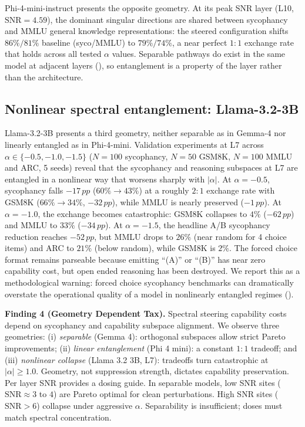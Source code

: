 \documentclass{article}
\newcommand{\snr}{\mathrm{SNR}}
\newcommand{\pp}{\,pp}
\begin{document}
Phi-4-mini-instruct presents the opposite geometry. At its peak SNR
layer (L10, $\snr{=}4.59$), the dominant singular directions are
shared between sycophancy and MMLU general knowledge representations:
the steered configuration shifts $86\%/81\%$ baseline (syco/MMLU) to
$79\%/74\%$, a near perfect $1:1$ exchange rate that holds across
all tested $\alpha$ values. Separable pathways do exist in the same
model at adjacent layers (), so entanglement is a
property of the layer rather than the architecture.

\subsection{Nonlinear spectral entanglement: Llama-3.2-3B}
\label{sec:llama3b_entanglement}

Llama-3.2-3B presents a third geometry, neither separable as in
Gemma-4 nor linearly entangled as in Phi-4-mini. Validation
experiments at L7 across $\alpha \in \{-0.5, -1.0, -1.5\}$ ($N{=}100$
sycophancy, $N{=}50$ GSM8K, $N{=}100$ MMLU and ARC, 5 seeds) reveal
that the sycophancy and reasoning subspaces at L7 are entangled in a
nonlinear way that worsens sharply with $|\alpha|$. At
$\alpha{=}{-}0.5$, sycophancy falls $-17\pp$ ($60\%\!\to\!43\%$) at a
roughly $2:1$ exchange rate with GSM8K ($66\%\!\to\!34\%$, $-32\pp$),
while MMLU is nearly preserved ($-1\pp$). At $\alpha{=}{-}1.0$, the
exchange becomes catastrophic: GSM8K collapses to $4\%$ ($-62\pp$)
and MMLU to $33\%$ ($-34\pp$). At $\alpha{=}{-}1.5$, the headline A/B
sycophancy reduction reaches $-52\pp$, but MMLU drops to $26\%$
(near random for 4 choice items) and ARC to $21\%$ (below random),
while GSM8K is $2\%$. The forced choice format remains parseable
because emitting ``(A)'' or ``(B)'' has near zero capability cost,
but open ended reasoning has been destroyed. We report this as a
methodological warning: forced choice sycophancy benchmarks can
dramatically overstate the operational quality of a model in
nonlinearly entangled regimes ().

\begin{findingbox}
\textbf{Finding 4 (Geometry Dependent Tax).} 
Spectral steering capability costs depend on sycophancy and capability subspace alignment. We observe three geometries: 
(i) \emph{separable} (Gemma 4): orthogonal subspaces allow strict Pareto improvements; 
(ii) \emph{linear entanglement} (Phi 4 mini): a constant $1:1$ tradeoff; and 
(iii) \emph{nonlinear collapse} (Llama 3.2 3B, L7): tradeoffs turn catastrophic at $|\alpha|{\ge}1.0$. 
Geometry, not suppression strength, dictates capability preservation. 
Per layer SNR provides a dosing guide. In separable models, low SNR sites ($\snr{\approx}3$ to $4$) are Pareto optimal for clean perturbations. High SNR sites ($\snr{>}6$) collapse under aggressive $\alpha$. Separability is insufficient; doses must match spectral concentration.
\end{findingbox}
\end{document}
